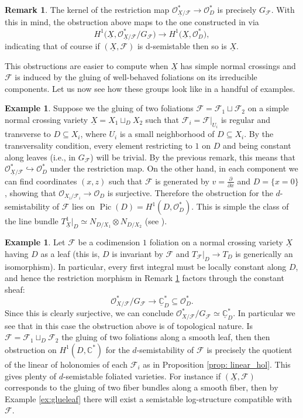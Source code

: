 \documentclass[reqno]{amsart}
\newcommand\C{\mathbb{C}}
\newcommand{\OO}{\mathcal{O}}
\newcommand{\F}{\mathscr{F}}
\DeclareMathOperator{\Pic}{Pic}
\theoremstyle{definition}
\newtheorem{remark}[theorem]{Remark}
\newtheorem{example}[theorem]{Example}
\theoremstyle{named}
\begin{document}
\begin{remark} \label{remark:restriction}
The kernel of the restriction map $\OO^\ast_{\underline{X}/\F}\rightarrow \OO_{D}^\ast$ is precisely $G_\F$. With this in mind, the obstruction above maps to the one constructed in \cite{olsson2003universal} via 
$$H^1\big(\underline{X},\OO^\ast_{\underline{X}/\F}/G_\F\big)\rightarrow  H^1\big(\underline{X},\OO^\ast_{D}\big),$$
indicating that of course if $(\underline{X},\F)$ is d-semistable then so is $\underline{X}$.
\end{remark}

This obstructions are easier to compute when $\underline{X}$ has simple normal crossings and $\F$ is induced by the gluing of well-behaved foliations on its irreducible components.
Let us now see how these groups look like in a handful of examples.


\begin{example} 
Suppose we the gluing of two foliations $\F =\F_1 \sqcup \F_2$ on a simple normal crossing variety $\underline{X}=X_1\sqcup_D X_2$ such that $\F_i=\F\vert_{U_i}$ is regular and transverse to $D\subseteq X_i$, where $U_i$ is a small neighborhood of $D\subseteq X_i$.
By the transversality condition, every element restricting to $1$ on $D$ and being constant along leaves (i.e., in $G_{\F}$) will be trivial. By the previous remark, this means that $\OO_{\underline{X}/\F}^\ast\hookrightarrow \OO_D^\ast$ under the restriction map.
On the other hand, in each component we can find coordinates $(x,z)$ such that $\F$ is generated by $v=\frac{\partial}{\partial x}$ and $D=\{x=0\}$, showing that $\OO_{X_i/\F_i}\to \OO_D$ is surjective. Therefore the obstruction for the $d$-semistability of $\F$ lies on $\Pic(D) = H^1(D,\OO_D^\ast)$. This is simple the class of the line bundle $T^1_{\underline{X}}\vert_D\simeq N_{D/X_1}\otimes N_{D/X_2}$ (see \cite{kato1996dlog_def}).
\end{example}

\begin{example}\label{ex:d_semi_leaf} 
Let $\F$ be a codimension $1$ foliation on a normal crossing variety $\underline{X}$ having $D$ as a leaf (this is, $D$ is invariant by $\F$ and $T_\F\vert_D\to T_D$ is generically an isomorphism). In particular, every first integral must be locally constant along $D$, and hence the restriction morphism in Remark \ref{remark:restriction} factors through the constant sheaf: 
$$\OO^\ast_{X/\F}/G_\F\rightarrow \underline{\C}^\ast_D\subseteq \OO_{D}^\ast.$$
Since this is clearly surjective, we can conclude $\OO^\ast_{X/\F}/G_\F\simeq \underline{\C}^\ast_D$. In particular we see that in this case the obstruction above is of topological nature. Is $\F = \F_1\sqcup_D \F_2$ the gluing of two foliations along a smooth leaf, then then obstruction on $H^1(D,\C^\ast)$ for the $d$-semistability of $\F$ is precisely the quotient of the linear of holonomies of each $\F_i$ as in Proposition \ref{prop: linear_hol}. This gives plenty of $d$-semistable foliated varieties. For instance if $(\underline{X},\F)$ corresponds to the gluing of two fiber bundles along a smooth fiber, then by Example \ref{ex:glueleaf} there will exist a semistable log-structure compatible with $\F$.
\end{example}
\end{document}
